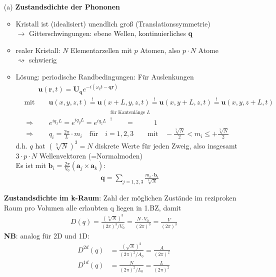 \begin{itemize}
	\item[(a)] \textbf{Zustandsdichte der Phononen}
	\begin{itemize}
		\item Kristall ist (idealisiert) unendlich groß (Translationssymmetrie)\\
		$\rightarrow$ Gitterschwingungen: ebene Wellen, kontinuierliches \textbf{q}
		\item realer Kristall: $N$ Elementarzellen mit $p$ Atomen, also $p \cdot N$ Atome\\
		$\rightsquigarrow$ schwierig
		\item Lösung: periodische Randbedingungen: Für Auslenkungen 
		\begin{align*}
			&\qquad \textbf{u}(\textbf{r},t) = \textbf{U}_{\textbf{q}} e^{-i(\omega_q t - \textbf{q} \textbf{r})}\\
			&\text{mit} \qquad \textbf{u}(x,y,z,t) \overset{!}{=} \textbf{u}(x+L,y,z,t) \overset{!}{=} \textbf{u}(x,y+L,z,t) \overset{!}{=} \textbf{u}(x,y,z+L,t)\\
			&\Rightarrow \qquad e^{i q_x L} = e^{i q_y L} = e^{i q_z L} \overset{\begin{matrix}
				\text{für Kantenlänge $L$}\\
				!
			\end{matrix}}{=} 1\\
			&\Rightarrow\qquad q_i = \frac{2\pi}{L} \cdot m_i \quad \text{für} \quad i=1,2,3\qquad \text{mit}\quad-\frac{\sqrt[3]{N}}{2}<m_i \leq +\frac{\sqrt[3]{N}}{2}
		\end{align*}
		d.h. $q$ hat $(\sqrt[3]{N})^3 = N$ diskrete Werte für jeden Zweig, also insgesamt $3 \cdot p \cdot N$ Wellenvektoren (=Normalmoden)\\
		Es ist mit $\textbf{b}_i = \frac{2 \pi}{V_0} (\textbf{a}_j \times \textbf{a}_k)$:
		\begin{align*}
			\textbf{q} = \sum_{j = 1,2,3} \frac{m_i \cdot \textbf{b}_i}{\sqrt[3]{N}}
		\end{align*}
	\end{itemize} 


\textbf{Zustandsdichte im k-Raum}: Zahl der möglichen Zustände im reziproken Raum pro Volumen alle erlaubten q liegen in 1.BZ, damit
\begin{align*}
	D(q) = \frac{(\sqrt[3]{N})^3}{(2\pi)^3/V_0} = \frac{N \cdot V_0}{(2\pi)^3} = \frac{V}{(2\pi)^3}
\end{align*}
\textbf{NB}: analog für 2D und 1D:
\begin{align*}
	D^{2d}(q) &= \frac{(\sqrt{N})^2}{(2\pi)^2/A_0} = \frac{A}{(2\pi)^2} \\
	D^{1d}(q) &= \frac{N}{(2\pi)^2/L_0} = \frac{L}{(2\pi)^2}
\end{align*}


\end{itemize}
